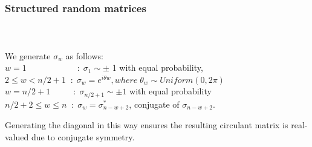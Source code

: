 \begin{frame}[t]
	\frametitle{Structured random matrices}
	\framesubtitle{~~}  %
	We generate $\sigma_{w}$ as follows:
	\\[1em]

	$w=1\qquad \qquad \qquad : \; \sigma_{1} \sim \pm$ 1 with equal probability,
	\\[1em]
	$2 \le w < n/2+1 \; \; : \; \sigma_{w}=e^{i\theta w}, where \; {\theta}_{w} \sim Uniform(0,2\pi) $
	\\[1em]
	$w=n/2+1 \qquad \; \; \, : \; \sigma_{n/2+1} \sim \pm 1 $ with equal probability 
	\\[1em]

	$n/2+2 \le w \le n \; \; : \; \sigma_{w}=\sigma^{*}_{n-w+2}$, conjugate of  $\sigma_{n-w+2}$.
	
	$$
	$$
	Generating the diagonal in this way ensures the resulting circulant matrix is real-valued due 
	to conjugate symmetry.
\end{frame}

